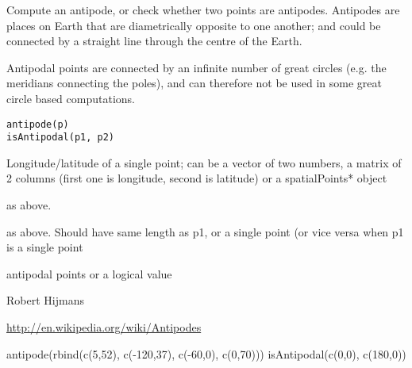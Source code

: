 \begin{Description}\relax
Compute an antipode, or check whether two points are antipodes. Antipodes are places on Earth that are diametrically opposite to one another; 
and could be connected by a straight line through the centre of the Earth.

Antipodal points are connected by an infinite number of great circles (e.g. the meridians connecting the poles), and can therefore not be used in some great circle based computations.
\end{Description}
\begin{Usage}
\begin{verbatim}
antipode(p)
isAntipodal(p1, p2)
\end{verbatim}
\end{Usage}
\begin{Arguments}
\begin{ldescription}
\item[\code{p}] Longitude/latitude of a single point; can be a vector of two numbers, a matrix of 2 columns (first one is longitude, second is latitude) or a spatialPoints* object
\item[\code{p1}] as above. 
\item[\code{p2}] as above. Should have same length as p1, or a single point (or vice versa when p1 is a single point
\end{ldescription}
\end{Arguments}
\begin{Value}
antipodal points or a logical value
\end{Value}
\begin{Author}\relax
Robert Hijmans
\end{Author}
\begin{References}\relax
\url{http://en.wikipedia.org/wiki/Antipodes}
\end{References}
\begin{Examples}
\begin{ExampleCode}
antipode(rbind(c(5,52), c(-120,37), c(-60,0), c(0,70)))
isAntipodal(c(0,0), c(180,0))
\end{ExampleCode}
\end{Examples}

